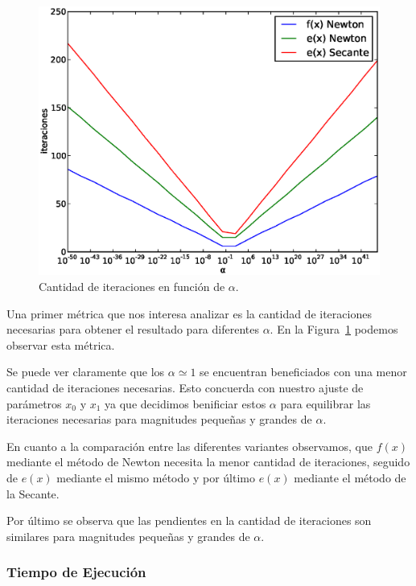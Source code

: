 \begin{figure}[!htbp]
  \begin{center}
    \includegraphics[scale=0.5]{graficos/new/comparacion_iteraciones.eps}
    \caption{\label{fig:comparacion_iteraciones} Cantidad de iteraciones en función de $\alpha$.}
  \end{center}
\end{figure}

Una primer métrica que nos interesa analizar es la cantidad de iteraciones
necesarias para obtener el resultado para diferentes $\alpha$.  En la
Figura~\ref{fig:comparacion_iteraciones} podemos observar esta métrica.

Se puede ver claramente que los $\alpha \simeq 1$ se encuentran beneficiados
con una menor cantidad de iteraciones necesarias. Esto concuerda con nuestro
ajuste de parámetros $x_0$ y $x_1$ ya que decidimos benificiar estos $\alpha$
para equilibrar las iteraciones necesarias para magnitudes pequeñas y grandes
de $\alpha$.

En cuanto a la comparación entre las diferentes variantes observamos, que
$f(x)$ mediante el método de Newton necesita la menor cantidad de iteraciones,
seguido de $e(x)$ mediante el mismo método y por último $e(x)$ mediante el
método de la Secante.

Por último se observa que las pendientes en la cantidad de iteraciones son
similares para magnitudes pequeñas y grandes de $\alpha$.


\subsubsection{Tiempo de Ejecución}

